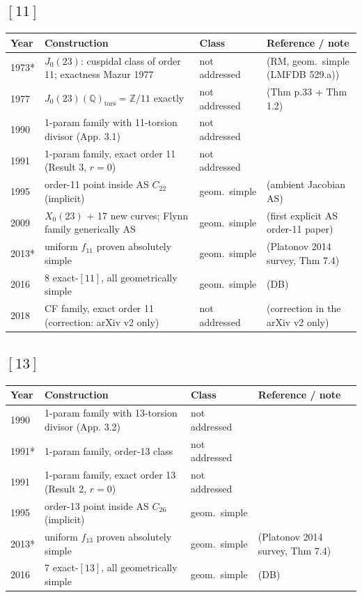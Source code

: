 \documentclass[10pt]{amsart}
\begin{document}
\subsection*{$[11]$}
\begin{longtable}{p{0.9cm} p{7.6cm} p{2.3cm} p{4.2cm}}
\hline Year & Construction & Class & Reference / note \\ \hline
1973* & $J_0(23)$: cuspidal class of order 11; exactness Mazur 1977 & not addressed & \cite{Ogg1973} (RM, geom.\ simple (LMFDB 529.a))\\
1977 & $J_0(23)(\mathbb{Q})_{\mathrm{tors}} = \mathbb{Z}/11$ exactly & not addressed & \cite{Mazur1977} (Thm p.33 + Thm 1.2)\\
1990 & 1-param family with 11-torsion divisor (App. 3.1) & not addressed & \cite{Flynn1990}\\
1991 & 1-param family, exact order 11 (Result 3, $r{=}0$) & not addressed & \cite{Flynn1991}\\
1995 & order-11 point inside AS $C_{22}$ (implicit) & geom.\ simple & \cite{Leprevost1995} (ambient Jacobian AS)\\
2009 & $X_0(23)$ + 17 new curves; Flynn family generically AS & geom.\ simple & \cite{BLP2009} (first explicit AS order-11 paper)\\
2013* & uniform $f_{11}$ proven absolutely simple & geom.\ simple & \cite{PZP2013} (Platonov 2014 survey, Thm 7.4)\\
2016 & 8 exact-$[11]$, all geometrically simple & geom.\ simple & \cite{BSSVY} (DB)\\
2018 & CF family, exact order 11 (correction: arXiv v2 only) & not addressed & \cite{DS2018} (correction in the arXiv v2 only)\\
\hline\end{longtable}
\subsection*{$[13]$}
\begin{longtable}{p{0.9cm} p{7.6cm} p{2.3cm} p{4.2cm}}
\hline Year & Construction & Class & Reference / note \\ \hline
1990 & 1-param family with 13-torsion divisor (App. 3.2) & not addressed & \cite{Flynn1990}\\
1991* & 1-param family, order-13 class & not addressed & \cite{Leprevost1991a}\\
1991 & 1-param family, exact order 13 (Result 2, $r{=}0$) & not addressed & \cite{Flynn1991}\\
1995 & order-13 point inside AS $C_{26}$ (implicit) & geom.\ simple & \cite{Leprevost1995}\\
2013* & uniform $f_{13}$ proven absolutely simple & geom.\ simple & \cite{PZP2013} (Platonov 2014 survey, Thm 7.4)\\
2016 & 7 exact-$[13]$, all geometrically simple & geom.\ simple & \cite{BSSVY} (DB)\\
\hline\end{longtable}
\end{document}

